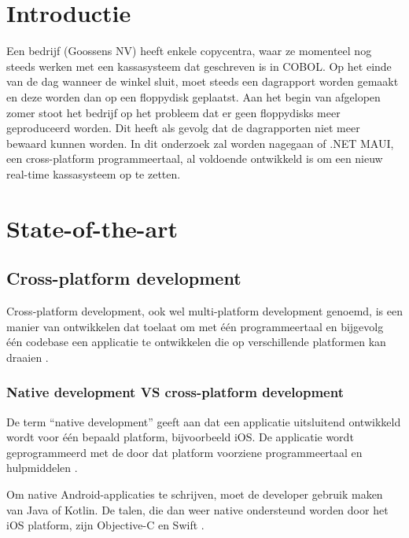 
\section{Introductie}%
\label{sec:introductie}

Een bedrijf (Goossens NV) heeft enkele copycentra, waar ze momenteel nog steeds werken met een kassasysteem dat geschreven is in COBOL. Op het einde van de dag wanneer de winkel sluit, moet steeds een dagrapport worden gemaakt en deze worden dan op een floppydisk geplaatst. Aan het begin van afgelopen zomer stoot het bedrijf op het probleem dat er geen floppydisks meer geproduceerd worden. Dit heeft als gevolg dat de dagrapporten niet meer bewaard kunnen worden. In dit onderzoek zal worden nagegaan of .NET MAUI, een cross-platform programmeertaal, al voldoende ontwikkeld is om een nieuw real-time kassasysteem op te zetten.


\section{State-of-the-art}%
\label{sec:state-of-the-art}

\subsection{Cross-platform development}
Cross-platform development, ook wel multi-platform development genoemd, is een manier van ontwikkelen dat toelaat om met één programmeertaal en bijgevolg één codebase een applicatie te ontwikkelen die op verschillende platformen kan draaien \autocite{KotlinFoundation2022}. 

\subsubsection{Native development VS cross-platform development}
De term “native development” geeft aan dat een applicatie uitsluitend ontwikkeld wordt voor één bepaald platform, bijvoorbeeld iOS. De applicatie wordt geprogrammeerd met de door dat platform voorziene programmeertaal en hulpmiddelen \autocite{Marchuk}.

Om native Android-applicaties te schrijven, moet de developer gebruik maken van Java of Kotlin. De talen, die dan weer native ondersteund worden door het iOS platform, zijn Objective-C en Swift \autocite{Schmitt2022}.


